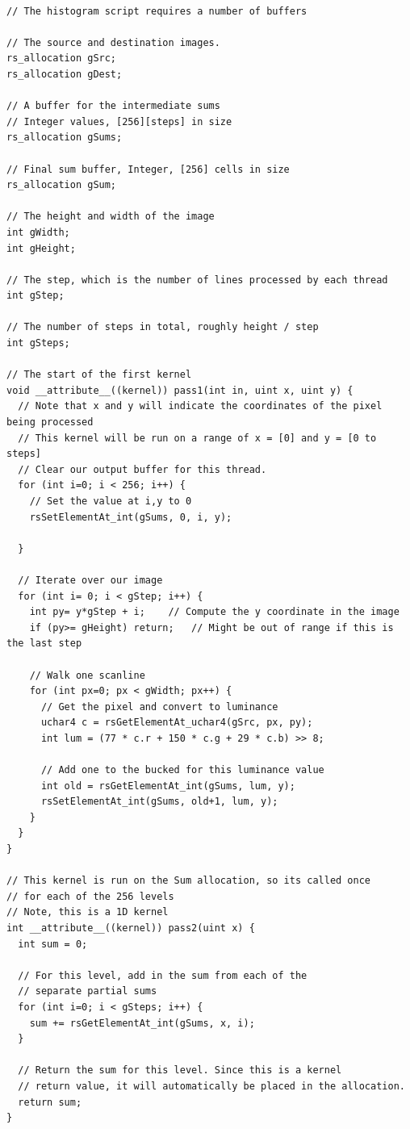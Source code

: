 \begin{lstlisting}[frame=single]

// The histogram script requires a number of buffers

// The source and destination images.
rs_allocation gSrc;
rs_allocation gDest;

// A buffer for the intermediate sums
// Integer values, [256][steps] in size
rs_allocation gSums;

// Final sum buffer, Integer, [256] cells in size
rs_allocation gSum;

// The height and width of the image
int gWidth;
int gHeight;

// The step, which is the number of lines processed by each thread
int gStep;

// The number of steps in total, roughly height / step
int gSteps;

// The start of the first kernel
void __attribute__((kernel)) pass1(int in, uint x, uint y) {
  // Note that x and y will indicate the coordinates of the pixel being processed
  // This kernel will be run on a range of x = [0] and y = [0 to steps]
  // Clear our output buffer for this thread.
  for (int i=0; i < 256; i++) {
    // Set the value at i,y to 0
    rsSetElementAt_int(gSums, 0, i, y);

  }

  // Iterate over our image
  for (int i= 0; i < gStep; i++) {
    int py= y*gStep + i;	// Compute the y coordinate in the image
    if (py>= gHeight) return;	// Might be out of range if this is the last step

    // Walk one scanline
    for (int px=0; px < gWidth; px++) {
      // Get the pixel and convert to luminance
      uchar4 c = rsGetElementAt_uchar4(gSrc, px, py);
      int lum = (77 * c.r + 150 * c.g + 29 * c.b) >> 8;

      // Add one to the bucked for this luminance value
      int old = rsGetElementAt_int(gSums, lum, y);
      rsSetElementAt_int(gSums, old+1, lum, y);
    }
  }
}

// This kernel is run on the Sum allocation, so its called once
// for each of the 256 levels
// Note, this is a 1D kernel
int __attribute__((kernel)) pass2(uint x) {
  int sum = 0;

  // For this level, add in the sum from each of the
  // separate partial sums
  for (int i=0; i < gSteps; i++) {
    sum += rsGetElementAt_int(gSums, x, i);
  }

  // Return the sum for this level. Since this is a kernel
  // return value, it will automatically be placed in the allocation.
  return sum;
}


\end{lstlisting}
